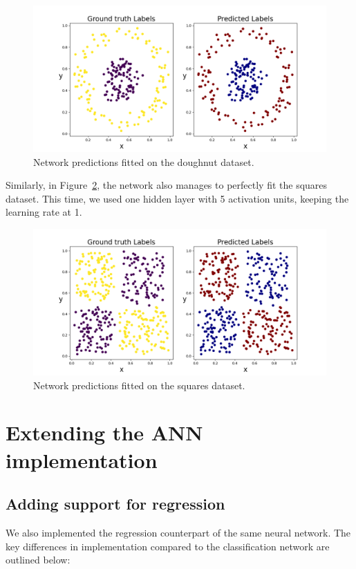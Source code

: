 \documentclass[9pt]{IEEEtran}
\begin{document}
\begin{figure}[h]
    \centering
    \includegraphics[width=1\columnwidth]{figures/doughnut.png}
    \caption{Network predictions fitted on the doughnut dataset.}
    \label{fig:doughnut}
\end{figure}

Similarly, in Figure~\ref{fig:squares}, the network also manages to perfectly fit the squares dataset. 
This time, we used one hidden layer with 5 activation units, keeping the learning rate at 1.

\begin{figure}[h]
    \centering
    \includegraphics[width=1\columnwidth]{figures/squares.png}
    \caption{Network predictions fitted on the squares dataset.}
    \label{fig:squares}
\end{figure}

\section{Extending the ANN implementation}
\subsection{Adding support for regression}
We also implemented the regression counterpart of the same neural network.
 The key differences in implementation compared to the classification network are outlined below:
\end{document}
